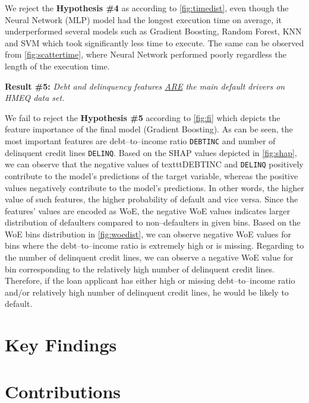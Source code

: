 We reject the \textbf{Hypothesis \#4} as according to \autoref{fig:timedist}, even though the Neural Network (MLP) model had the longest execution time on average, it underperformed several models such as Gradient Boosting, Random Forest, KNN and SVM which took significantly less time to execute. The same can be observed from \autoref{fig:scattertime}, where Neural Network performed poorly regardless the length of the execution time.
\vspace{0.3cm}

\noindent \textbf{Result \#5:} \textit{Debt and delinquency features \underline{ARE} the main default drivers on HMEQ data set.}

We fail to reject the \textbf{Hypothesis \#5} according to \autoref{fig:fi} which depicts the feature importance of the final model (Gradient Boosting). As can be seen, the most important features are debt--to--income ratio \texttt{DEBTINC} and number of delinquent credit lines \texttt{DELINQ}.
Based on the SHAP values depicted in \autoref{fig:shap}, we can observe that the negative values of texttt{DEBTINC} and \texttt{DELINQ} positively contribute to the model's predictions of the target variable, whereas the positive values negatively contribute to the model's predictions.
In other words, the higher value of such features, the higher probability of default and vice versa.
Since the features' values are encoded as WoE, the negative WoE values indicates larger distribution of defaulters compared to non--defaulters in given bins.
Based on the WoE bins distribution in \autoref{fig:woedist}, we can observe negative WoE values for bins where the debt--to--income ratio is extremely high or is missing. Regarding to the number of delinquent credit lines, we can observe a negative WoE value for bin corresponding to the relatively high number of delinquent credit lines.
Therefore, if the loan applicant has either high or missing debt--to--income ratio and/or relatively high number of delinquent credit lines,  he would be likely to default.


\section{Key Findings}

\section{Contributions}

